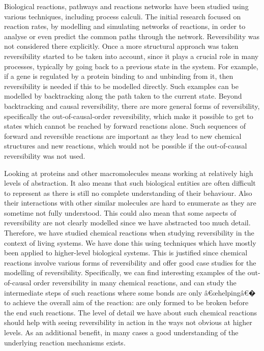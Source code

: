 \documentclass[runningheads]{llncs}
\begin{document}
Biological reactions, pathways and reactions networks have been studied using
various  techniques,  including  process  calculi.   The  initial  research  focused  on
reaction rates, by modelling and simulating networks of reactions, in order to
analyse or even predict the common paths through the network.  Reversibility
was not considered there explicitly.  Once a more structural approach was taken
reversibility  started  to  be  taken  into  account,  since  it  plays  a  crucial  role  in
many processes, typically by going back to a previous state in the system.  For
example, if a gene is regulated by a protein binding to and unbinding from it,
then reversibility is needed if this to be modelled directly.  Such examples can
be modelled by backtracking along the path taken to the current state.  Beyond
backtracking and causal reversibility, there are more general forms of reversibility, specifically the out-of-causal-order reversibility, which make it possible to get
to states which cannot be reached by forward reactions alone.  Such sequences
of forward and reversible reactions are important as they lead to new chemical
structures and new reactions, which would not be possible if the out-of-causal
reversibility was not used.

Looking at proteins and other macromolecules means working at relatively
high  levels  of  abstraction.   It  also  means  that  such  biological  entities  are  often  difficult  to  represent  as  there  is  still  no  complete  understanding  of  their
behaviour.  Also their interactions with other similar molecules are hard to enumerate as they are sometime not fully understood.  This could also mean that
some aspects of reversibility are not clearly modelled since we have abstracted
too  much  detail. Therefore,  we  have  studied chemical  reactions  when
studying reversibility in the context of living systems. We have done this using techniques which have mostly been applied to higher-level biological systems. This is justified since chemical reactions involve various forms of reversibility and offer good case
studies  for  the  modelling  of  reversibility.   Specifically,  we  can  find  interesting
examples  of  the  out-of-causal  order  reversibility  in  many  chemical  reactions,
and can study the intermediate steps of such reactions where some bonds are
only â€œhelpingâ€� to achieve the overall aim of the reaction:  are only formed to be
broken before the end such reactions.  The level of detail we have about such
chemical  reactions  should  help  with  seeing  reversibility  in  action  in  the  ways
not obvious at higher levels.  As an additional benefit,  in many cases a good
understanding of the underlying reaction mechanisms exists.
\end{document}
